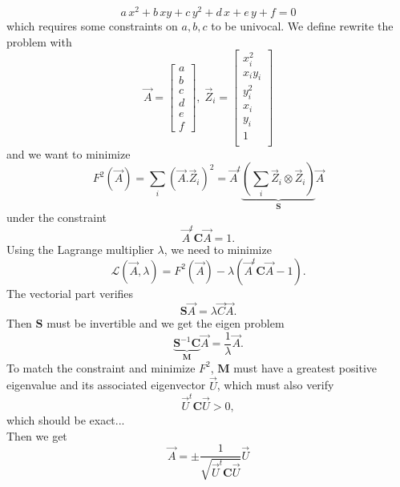 \documentclass[aps]{revtex4}
\begin{document}
\begin{equation}
\label{eq:ell_alg}
	a\,x^2+b\,xy+c\,y^2 + d\,x+e\,y+f = 0
\end{equation}
which requires some constraints on $a,b,c$ to be univocal.
We define rewrite the problem with
\begin{equation}
	\vec{A} = \begin{bmatrix}
	a\\
	b\\
	c\\
	d\\
	e\\
	f
	\end{bmatrix}, 
	\; 
	\vec{Z}_i = 
	\begin{bmatrix}
	x_i^2\\
	x_iy_i\\
	y_i^2\\
	x_i\\
	y_i\\
	1\\
	\end{bmatrix}
\end{equation}
and we want to minimize
\begin{equation}
F^2\left(\vec{A}\right) = \sum_i \left(\vec{A}.\vec{Z}_i\right)^2
= \vec{A}^t \underbrace{\left(\sum_i \vec{Z}_i \otimes \vec{Z}_i \right)}_{\bm{S}} \vec{A}
\end{equation}
under the constraint
\begin{equation}
	\vec{A}^t \bm{C} \vec{A} = 1.
\end{equation}
Using the Lagrange multiplier $\lambda$, we need to minimize
\begin{equation}
	\mathcal{L}\left(\vec{A},\lambda\right) = F^2\left(\vec{A}\right) - \lambda \left( \vec{A}^t \bm{C} \vec{A} -1 \right).
\end{equation}
The vectorial part verifies
\begin{equation}
	\bm{S} \vec{A} = \lambda \vec{C} \vec{A}.
\end{equation}
Then $\bm{S}$ must be invertible and we get the eigen problem
\begin{equation}
	\underbrace{\bm{S}^{-1}\bm{C}}_{\displaystyle \bm{M}} \vec{A} = \dfrac{1}{\lambda} \vec{A}.
\end{equation}
To match the constraint and minimize $F^2$, $\bm{M}$ must have a greatest positive eigenvalue
and its associated eigenvector $\vec{U}$, which must also verify 
\begin{equation}
	\vec{U}^t \bm{C} \vec{U} > 0,
\end{equation}
which should be exact...\\
Then we get
\begin{equation}
	\vec{A} = \pm\dfrac{1}{\sqrt{\vec{U}^t \bm{C} \vec{U}}} \vec{U}
\end{equation}
\end{document}
